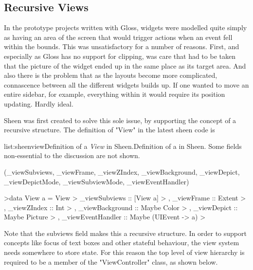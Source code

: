\subsection{Recursive Views}

In the prototype projects written with Gloss, widgets were modelled quite simply as having an area of the screen that would trigger actions when an event fell within the bounds. This was unsatisfactory  for a number of reasons. First, and especially as Gloss has no support for clipping, was care that had to be taken that the picture of the widget ended up in the same place as its target area. And also there is the problem that as the layouts become more complicated, connascence between all the different widgets builds up. If one wanted to move an entire sidebar, for example, everything within it would require its position updating. Hardly ideal.

Sheen was first created to solve this sole issue, by supporting the concept of a recursive structure. The definition of "View" in the latest sheen code is

\vspace{-0.5em}
\begin{listing}{list:sheenview}{Definition of a \emph{View} in Sheen.}{Definition of a  in Sheen. Some fields non-essential to the discussion are not shown.}{}
\end{listing}\vspace{-1.5em}

\functions(_viewSubviews, _viewFrame, _viewZIndex, _viewBackground, _viewDepict, _viewDepictMode, _viewSubviewMode, _viewEventHandler)
\begin{haskell}

>data View a = View
>  {  _viewSubviews     :: [View a]
>  ,  _viewFrame        :: Extent
>  ,  _viewZIndex       :: Int
>  ,  _viewBackground   :: Maybe Color
>  ,  _viewDepict       :: Maybe Picture
>  ,  _viewEventHandler :: Maybe (UIEvent -> a)
>  }

\end{haskell}
\noindent 
Note that the subviews field makes this a recursive structure. In order to support concepts like focus of text boxes and other stateful behaviour, the view system needs somewhere to store state. For this reason the top level of view hierarchy is required to be a member of the "ViewController" class, as shown below.

